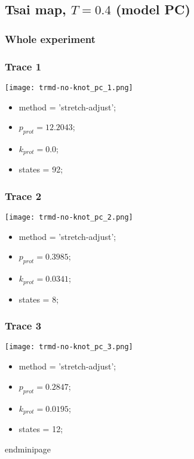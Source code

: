\begin{minipage}[c]{0.45\textwidth}
\subsection{Tsai map, $T=0.4$ (model PC)}
\subsubsection{Whole experiment}

\subsubsection{Trace 1}
\begin{minipage}[c]{0.7\textwidth}
    \texttt{[image: trmd-no-knot\_pc\_1.png]}
\end{minipage}
\hfill
\begin{minipage}[c]{0.45\textwidth}
    \begin{itemize}
        \item method = 'stretch-adjust';
        \item $p_{prot}=12.2043$;
        \item $k_{prot}=0.0$;
        \item states = 92;
    \end{itemize}
\end{minipage}

\subsubsection{Trace 2}
\begin{minipage}[c]{0.7\textwidth}
    \texttt{[image: trmd-no-knot\_pc\_2.png]}
\end{minipage}
\hfill
\begin{minipage}[c]{0.45\textwidth}
    \begin{itemize}
        \item method = 'stretch-adjust';
        \item $p_{prot}=0.3985$;
        \item $k_{prot}=0.0341$;
        \item states = 8;
    \end{itemize}
\end{minipage}

\subsubsection{Trace 3}
\begin{minipage}[c]{0.7\textwidth}
    \texttt{[image: trmd-no-knot\_pc\_3.png]}
\end{minipage}
\hfill
\begin{minipage}[c]{0.45\textwidth}
    \begin{itemize}
        \item method = 'stretch-adjust';
        \item $p_{prot}=0.2847$;
        \item $k_{prot}=0.0195$;
        \item states = 12;
    \end{itemize}
end{minipage}


\end{minipage}
\end{minipage}
